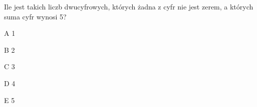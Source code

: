 \begin{tresc}
Ile jest takich liczb dwucyfrowych, których żadna z cyfr nie jest zerem, a których suma cyfr wynosi 5?
\end{tresc}
\begin{wariant}{A} 1 \end{wariant}
\begin{wariant}{B} 2 \end{wariant}
\begin{wariant}{C} 3 \end{wariant}
\begin{wariant}{D} 4 \end{wariant}
\begin{wariant}{E} 5 \end{wariant}
